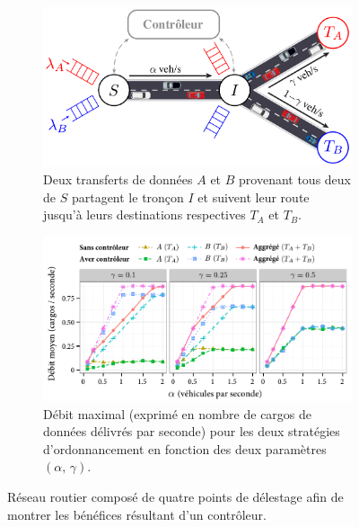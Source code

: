  
\begin{figure}[ht] 
    \centering 
    \begin{subfigure}[t]{0.45\columnwidth} 
        \centering 
        \includegraphics[width=\textwidth]{figures-fr/simpleScenario-fr.pdf} 
        \caption{Deux transferts de données $A$ et $B$ provenant tous deux de $S$ partagent le tronçon $I$ et suivent leur route jusqu’à leurs destinations respectives $T_A$ et $T_B$.} 
        \label{fig:simple-scenario-fr} 
    \end{subfigure}%
    \quad %
    \begin{subfigure}[t]{0.51\columnwidth} 
        \centering 
        \includegraphics[width=\textwidth]{figures-fr/simpleScenario-throughput_v2_gamma_all-fr.pdf} 
        \caption{Débit maximal (exprimé en nombre de cargos de données délivrés par seconde) pour les deux stratégies d’ordonnancement en fonction des deux paramètres $(\alpha,\,\gamma)$.} 
        \label{fig:simple-scenario-throughput-fr} 
    \end{subfigure} 
    \caption{Réseau routier composé de quatre points de délestage afin de montrer les bénéfices résultant d’un contrôleur.} 
\end{figure} 
 
